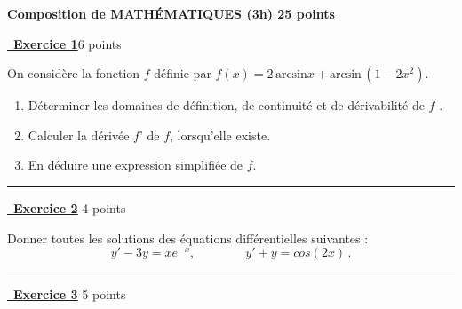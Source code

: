 \documentclass[a4paper,12pt]{article}
\begin{document}
\vspace{2em}

\begin{center}\bf {\Large\underline{Composition de MATH\'EMATIQUES  (3h) 25 points}}\end{center}
\hfill\break

\vspace{2em}
\underline {\, \bf{Exercice 1}}\hfill  6 points\\
\vspace{1em}

On considère la fonction $f$ définie par $f (x) = 2 \, \text{arcsin} x + \text{arcsin}\,(1 - 2x^2)$.
\begin{enumerate}
    \item Déterminer les domaines de définition, de continuité et de dérivabilité de $f$ .
\item Calculer la dérivée $f $' de $f$, lorsqu’elle existe.
\item En déduire une expression simplifiée de $f$.

\end{enumerate}


\hfill\break
\hrule
\hfill\break

\vspace{2em}
\underline {\, \bf{Exercice 2}} \hfill 4 points\\
\vspace{1em}


Donner toutes les solutions des équations différentielles suivantes : 
$$
y' -3y = xe^{-x}, \qquad \qquad  y' + y = cos(2x)\,.
$$
%


\hfill\break
\hrule
\hfill\break


\vspace{2em}
\underline {\, \bf{Exercice 3}} \hfill 5 points\\
\vspace{1em}
\end{document}
